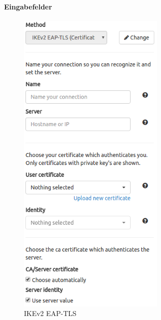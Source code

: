 \noindent\begin{minipage}[t]{0.5\textwidth}
\vspace{0pt}
\paragraph{Eingabefelder}\mbox{}\medskip
    \begin{figure}[H]
    	\centering
    	\includegraphics[width=200pt]{images/forms/ikev2_eap_tls.png}
    	\caption{IKEv2 EAP-TLS}
    \end{figure}
\end{minipage}
\hfill
